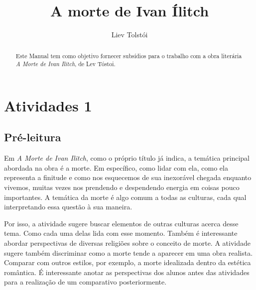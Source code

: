\documentclass[12pt]{extarticle}
\begin{document}
\newcommand{\AutorLivro}{Liev Tolstói}
\newcommand{\TituloLivro}{A morte de Ivan Ílitch}
\newcommand{\Tema}{Ficção, mistério e fantasia}
\newcommand{\Genero}{Romance}
\newcommand{\imagemCapa}{./images/PNLD0042-01.png}
\newcommand{\issnppub}{---}
\newcommand{\issnepub}{---}
\newcommand{\colaborador}{\textbf{Bruno Gradella e Vicente Castro} é uma pessoa incrível e vai fazer um bom serviço.}


\title{\TituloLivro}
\author{\AutorLivro}
\def\authornotes{\colaborador}

\date{}
\maketitle

\begin{abstract}
Este Manual tem como objetivo fornecer subsídios para o trabalho com a
obra literária \emph{A Morte de Ivan Ilitch}, de Lev Tóstoi.
\end{abstract}

\tableofcontents




\section{Atividades 1}


\subsection{Pré-leitura}


Em \emph{A Morte de Ivan Ilitch}, como o próprio título já
indica, a temática principal abordada na obra é a morte. Em específico,
como lidar com ela, como ela representa a finitude e como nos esquecemos
de sua inexorável chegada enquanto vivemos, muitas vezes nos prendendo e
despendendo energia em coisas pouco importantes. A temática da morte é
algo comum a todas as culturas, cada qual interpretando essa questão à
sua maneira.

Por isso, a atividade sugere buscar elementos de outras culturas acerca
desse tema. Como cada uma delas lida com esse momento. Também é
interessante abordar perspectivas de diversas religiões sobre o conceito
de morte. A atividade sugere também discriminar como a morte tende a
aparecer em uma obra realista. Comparar com outros estilos, por exemplo,
a morte idealizada dentro da estética romântica. É interessante anotar
as perspectivas dos alunos antes das atividades para a realização de um
comparativo posteriormente.
\end{document}
